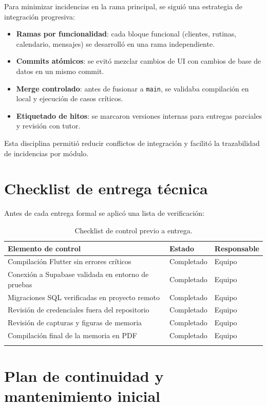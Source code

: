 Para minimizar incidencias en la rama principal, se siguió una estrategia de integración progresiva:

\begin{itemize}
  \item \textbf{Ramas por funcionalidad}: cada bloque funcional (clientes, rutinas, calendario, mensajes) se desarrolló en una rama independiente.
  \item \textbf{Commits atómicos}: se evitó mezclar cambios de UI con cambios de base de datos en un mismo commit.
  \item \textbf{Merge controlado}: antes de fusionar a \texttt{main}, se validaba compilación en local y ejecución de casos críticos.
  \item \textbf{Etiquetado de hitos}: se marcaron versiones internas para entregas parciales y revisión con tutor.
\end{itemize}

Esta disciplina permitió reducir conflictos de integración y facilitó la trazabilidad de incidencias por módulo.

\section{Checklist de entrega técnica}

Antes de cada entrega formal se aplicó una lista de verificación:

\begin{longtable}{@{}p{8.5cm}p{2.5cm}p{3cm}@{}}
\toprule
\textbf{Elemento de control} & \textbf{Estado} & \textbf{Responsable} \\
\midrule
\endhead
Compilación Flutter sin errores críticos & Completado & Equipo \\
Conexión a Supabase validada en entorno de pruebas & Completado & Equipo \\
Migraciones SQL verificadas en proyecto remoto & Completado & Equipo \\
Revisión de credenciales fuera del repositorio & Completado & Equipo \\
Revisión de capturas y figuras de memoria & Completado & Equipo \\
Compilación final de la memoria en PDF & Completado & Equipo \\
\bottomrule
\caption{Checklist de control previo a entrega.}
\end{longtable}

\section{Plan de continuidad y mantenimiento inicial}

